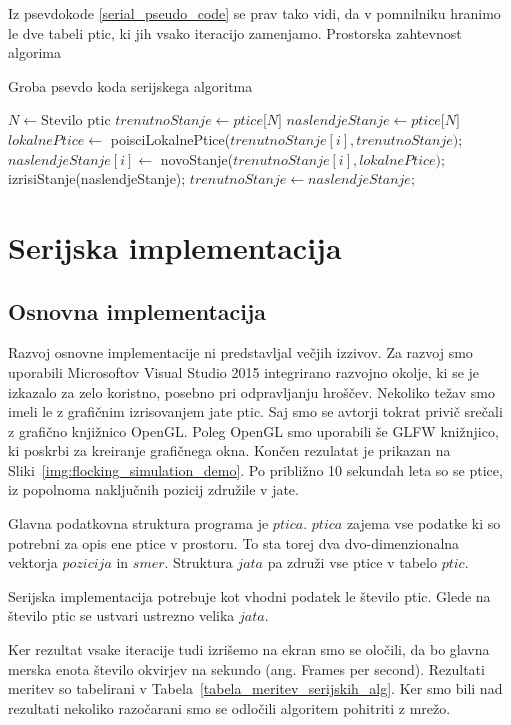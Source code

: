 \documentclass[a4paper, 12pt]{book}
\begin{document}
Iz psevdokode \ref{serial_pseudo_code} se prav tako vidi, da v pomnilniku hranimo le dve tabeli ptic, ki jih vsako iteracijo zamenjamo. Prostorska zahtevnost algorima %
\begin{algorithm}
\caption{Groba psevdo koda serijskega algoritma}\label{serial_pseudo_code}
\begin{algorithmic}[1]
\State $N \gets \text{Stevilo ptic}$
\State $trenutnoStanje \gets \textit{ptice[N]}$
\State $naslendjeStanje \gets \textit{ptice[N]}$
\Loop
{}
\State $lokalnePtice \gets$ poisciLokalnePtice($trenutnoStanje[i], trenutnoStanje);$
\State $naslendjeStanje[i] \gets$ novoStanje($trenutnoStanje[i], lokalnePtice);$
\EndFor
\State izrisiStanje(naslendjeStanje);
\State $trenutnoStanje \gets naslendjeStanje;$
\EndLoop
\end{algorithmic}
\end{algorithm}

\chapter{Serijska implementacija}
\label{ch1}
\section{Osnovna implementacija}
Razvoj osnovne implementacije ni predstavljal večjih izzivov. Za razvoj smo uporabili Microsoftov Visual Studio 2015 integrirano razvojno okolje, ki se je izkazalo za zelo koristno, posebno pri odpravljanju hroščev. Nekoliko težav smo imeli le z grafičnim izrisovanjem jate ptic. Saj smo se avtorji tokrat privič srečali z grafično knjižnico OpenGL. Poleg OpenGL smo uporabili še GLFW knižnjico, ki poskrbi za kreiranje grafičnega okna. Končen rezulatat je prikazan na Sliki~\ref{img:flocking_simulation_demo}. Po približno 10 sekundah leta so se ptice, iz popolnoma naključnih pozicij združile v jate.

Glavna podatkovna struktura programa je $ptica$. $ptica$ zajema vse podatke ki so potrebni za opis ene ptice v prostoru. To sta torej dva dvo-dimenzionalna vektorja $pozicija$ in $smer$. Struktura $jata$ pa združi vse ptice v tabelo $ptic$.

Serijska implementacija potrebuje kot vhodni podatek le število ptic. Glede na število ptic se ustvari ustrezno velika $jata$.

Ker rezultat vsake iteracije tudi izrišemo na ekran smo se oločili, da bo glavna merska enota število okvirjev na sekundo (ang. Frames per second). Rezultati meritev so tabelirani v Tabela~\ref{tabela_meritev_serijskih_alg}. Ker smo bili nad rezultati nekoliko razočarani smo se odločili algoritem pohitriti z mrežo.
\end{document}
